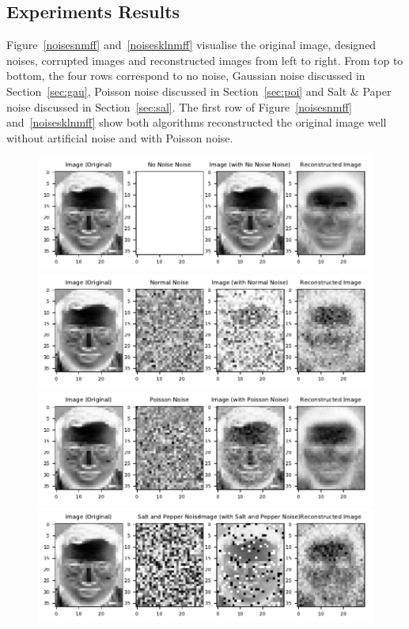 \subsection{Experiments Results}
Figure~\ref{noisesnmff} and~\ref{noisesklnmff} visualise the original image, designed noises, corrupted images and reconstructed images from left to right. From top to bottom, the four rows correspond to no noise, Gaussian noise discussed in Section~\ref{sec:gau}, Poisson noise discussed in Section~\ref{sec:poi} and Salt \& Paper noise discussed in Section~\ref{sec:sal}.
The first row of Figure~\ref{noisesnmff} and~\ref{noisesklnmff} show both algorithms reconstructed the original image well without artificial noise and with Poisson noise.
\begin{figure}
	\centering
	\includegraphics[scale=.9]{Result_Multiplication_Euclidean_No_Noise_Comparison}\\
	\includegraphics[scale=.9]{Result_Multiplication_Euclidean_Normal_Comparison}\\
	\includegraphics[scale=.9]{Result_Multiplication_Euclidean_Poisson_Comparison}\\
	\includegraphics[scale=.9]{Result_Multiplication_Euclidean_Salt_and_Pepper_Comparison}

\end{figure}
